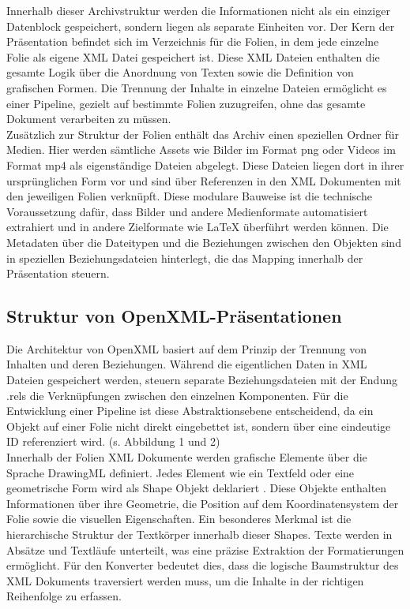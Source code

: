 \documentclass[a4paper]{article}
\begin{document}
Innerhalb dieser Archivstruktur werden die Informationen nicht als ein einziger Datenblock gespeichert, sondern liegen als separate Einheiten vor. Der Kern der Präsentation befindet sich im Verzeichnis für die Folien, in dem jede einzelne Folie als eigene XML Datei gespeichert ist. Diese XML Dateien enthalten die gesamte Logik über die Anordnung von Texten sowie die Definition von grafischen Formen. Die Trennung der Inhalte in einzelne Dateien ermöglicht es einer Pipeline, gezielt auf bestimmte Folien zuzugreifen, ohne das gesamte Dokument verarbeiten zu müssen. \\

Zusätzlich zur Struktur der Folien enthält das Archiv einen speziellen Ordner für Medien. Hier werden sämtliche Assets wie Bilder im Format png oder Videos im Format mp4 als eigenständige Dateien abgelegt. Diese Dateien liegen dort in ihrer ursprünglichen Form vor und sind über Referenzen in den XML Dokumenten mit den jeweiligen Folien verknüpft. Diese modulare Bauweise ist die technische Voraussetzung dafür, dass Bilder und andere Medienformate automatisiert extrahiert und in andere Zielformate wie LaTeX überführt werden können. Die Metadaten über die Dateitypen und die Beziehungen zwischen den Objekten sind in speziellen Beziehungsdateien hinterlegt, die das Mapping innerhalb der Präsentation steuern. 

\subsection{Struktur von OpenXML-Präsentationen} 

Die Architektur von OpenXML basiert auf dem Prinzip der Trennung von Inhalten und deren Beziehungen. Während die eigentlichen Daten in XML Dateien gespeichert werden, steuern separate Beziehungsdateien mit der Endung .rels die Verknüpfungen zwischen den einzelnen Komponenten. Für die Entwicklung einer Pipeline ist diese Abstraktionsebene entscheidend, da ein Objekt auf einer Folie nicht direkt eingebettet ist, sondern über eine eindeutige ID referenziert wird. (s. Abbildung 1 und 2) \\

Innerhalb der Folien XML Dokumente werden grafische Elemente über die Sprache DrawingML \citep{DrawingMLOverview} definiert. Jedes Element wie ein Textfeld oder eine geometrische Form wird als Shape Objekt deklariert \citep{Wordprocessing}. Diese Objekte enthalten Informationen über ihre Geometrie, die Position auf dem Koordinatensystem der Folie sowie die visuellen Eigenschaften. Ein besonderes Merkmal ist die hierarchische Struktur der Textkörper innerhalb dieser Shapes. Texte werden in Absätze und Textläufe unterteilt, was eine präzise Extraktion der Formatierungen ermöglicht. Für den Konverter bedeutet dies, dass die logische Baumstruktur des XML Dokuments traversiert werden muss, um die Inhalte in der richtigen Reihenfolge zu erfassen. \\
\end{document}

